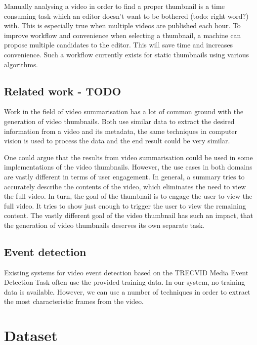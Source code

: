 \documentclass{../resources/acm_proc_article-sp}
\begin{document}


Manually analysing a video in order to find a proper thumbnail is a time consuming task which an editor doesn't want to be bothered (todo: right word?) with. This is especially true when multiple videos are published each hour. To improve workflow and convenience when selecting a thumbnail, a machine can propose multiple candidates to the editor. This will save time and increases convenience. Such a workflow currently exists for static thumbnails using various algorithms.


\subsection{Related work - TODO}

Work in the field of video summarisation has a lot of common ground with the generation of video thumbnails. Both use similar data to extract the desired information from a video and its metadata, the same techniques in computer vision is used to process the data and the end result could be very similar. 

One could argue that the results from video summarisation could be used in some implementations of the video thumbnails. However, the use cases in both domains are vastly different in terms of user engagement. In general, a summary tries to accurately describe the contents of the video, which eliminates the need to view the full video. In turn, the goal of the thumbnail is to engage the user to view the full video. It tries to show just enough to trigger the user to view the remaining content. The vastly different goal of the video thumbnail has such an impact, that the generation of video thumbnails deserves its own separate task.


\subsection{Event detection}

Existing systems for video event detection based on the TRECVID Media Event Detection Task often use the provided training data. In our system, no training data is available. However, we can use a number of techniques in order to extract the most characteristic frames from the video.

\section{Dataset}
\end{document}
